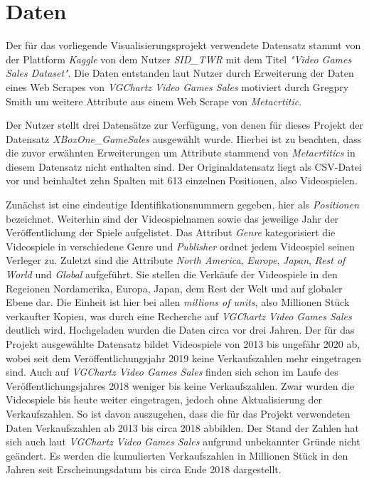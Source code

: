 \documentclass[usegeometry=true]{scrartcl}
\begin{document}
\section{Daten}
Der für das vorliegende Visualisierungsprojekt verwendete Datensatz stammt von der Plattform \textit{Kaggle} von dem Nutzer \textit{SID\_TWR} mit dem Titel \textit{"Video Games Sales Dataset"}.\cite{SID_TWR.} 
Die Daten entstanden laut Nutzer durch Erweiterung der Daten eines Web Scrapes von \textit{VGChartz Video Games Sales} motiviert durch Gregpry Smith um weitere Attribute aus einem Web Scrape von \textit{Metacrtitic}.  

Der Nutzer stellt drei Datensätze zur Verfügung, von denen für dieses Projekt der Datensatz \textit{XBoxOne\_GameSales} ausgewählt wurde. 
Hierbei ist zu beachten, dass die zuvor erwähnten Erweiterungen um Attribute stammend von \textit{Metacrtitics} in diesem Datensatz nicht enthalten sind. 
Der Originaldatensatz liegt als CSV-Datei vor und beinhaltet zehn Spalten mit 613 einzelnen Positionen, also Videospielen. 

Zunächst ist eine eindeutige Identifikationsnummern gegeben, hier als \textit{Positionen} bezeichnet. Weiterhin sind der Videospielnamen sowie das jeweilige Jahr der Veröffentlichung der Spiele aufgelistet. 
Das Attribut \textit{Genre} kategorisiert die Videospiele in verschiedene Genre und \textit{Publisher} ordnet jedem Videospiel seinen Verleger zu. 
Zuletzt sind die Attribute \textit{North America}, \textit{Europe}, \textit{Japan}, \textit{Rest of World} und \textit{Global} aufgeführt. 
Sie stellen die Verkäufe der Videospiele in den Regeionen Nordamerika, Europa, Japan, dem Rest der Welt und auf globaler Ebene dar. 
Die Einheit ist hier bei allen \textit{millions of units}, also Millionen Stück verkaufter Kopien, was durch eine Recherche auf \textit{VGChartz Video Games Sales} deutlich wird. %
Hochgeladen wurden die Daten circa vor drei Jahren. Der für das Projekt ausgewählte Datensatz bildet Videospiele von 2013 bis ungefähr 2020 ab, wobei seit dem Veröffentlichungsjahr 2019 keine Verkaufszahlen mehr eingetragen sind. 
Auch auf \textit{VGChartz Video Games Sales} finden sich schon im Laufe des Veröffentlichungsjahres 2018 weniger bis keine Verkaufszahlen. 
Zwar wurden die Videospiele bis heute weiter eingetragen, jedoch ohne Aktualisierung der Verkaufszahlen. 
So ist davon auszugehen, dass die für das Projekt verwendeten Daten Verkaufszahlen ab 2013 bis circa 2018 abbilden. 
Der Stand der Zahlen hat sich auch laut \textit{VGChartz Video Games Sales} aufgrund unbekannter Gründe nicht geändert. 
Es werden die kumulierten Verkaufszahlen in Millionen Stück in den Jahren seit Erscheinungsdatum bis circa Ende 2018 dargestellt. 
\end{document}
